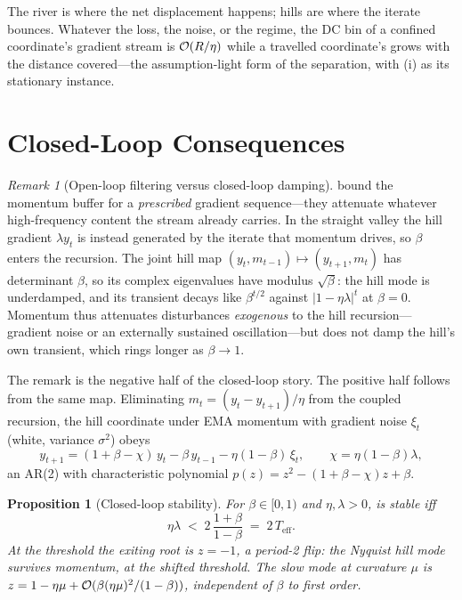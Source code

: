 \documentclass[11pt,a4paper]{article}
\newtheorem{proposition}{Proposition}
\theoremstyle{remark}
\newtheorem{remark}{Remark}
\newcommand{\Teff}{T_{\mathrm{eff}}}
\begin{document}
The river is where the net displacement happens; hills are where the iterate bounces.
Whatever the loss, the noise, or the regime, the DC bin of a confined coordinate's gradient stream is $\mathcal{O}(R/\eta)$ while a travelled coordinate's grows with the distance covered---the assumption-light form of the separation, with (i) as its stationary instance.

\section{Closed-Loop Consequences}
\label{sec:loop}

\begin{remark}[Open-loop filtering versus closed-loop damping]
\label{rem:closedloop}
 bound the momentum buffer for a \emph{prescribed} gradient sequence---they attenuate whatever high-frequency content the stream already carries.
In the straight valley the hill gradient $\lambda y_t$ is instead generated by the iterate that momentum drives, so $\beta$ enters the recursion.
The joint hill map $(y_t,m_{t-1})\mapsto(y_{t+1},m_t)$ has determinant $\beta$, so its complex eigenvalues have modulus $\sqrt\beta$: the hill mode is underdamped, and its transient decays like $\beta^{t/2}$ against $\lvert1-\eta\lambda\rvert^{t}$ at $\beta=0$.
Momentum thus attenuates disturbances \emph{exogenous} to the hill recursion---gradient noise or an externally sustained oscillation---but does not damp the hill's own transient, which rings longer as $\beta\to1$.
\end{remark}

The remark is the negative half of the closed-loop story.
The positive half follows from the same map.
Eliminating $m_t=(y_t-y_{t+1})/\eta$ from the coupled recursion, the hill coordinate under EMA momentum with gradient noise $\xi_t$ (white, variance $\sigma^2$) obeys
\begin{equation}
\label{eq:closedloop}
y_{t+1}=(1+\beta-\chi)\,y_t-\beta\,y_{t-1}-\eta(1-\beta)\,\xi_t,\qquad \chi=\eta(1-\beta)\lambda,
\end{equation}
an AR(2) with characteristic polynomial $p(z)=z^2-(1+\beta-\chi)z+\beta$.

\begin{proposition}[Closed-loop stability]
\label{prop:stability}
For $\beta\in[0,1)$ and $\eta,\lambda>0$,  is stable iff
\[
\eta\lambda\;<\;2\,\frac{1+\beta}{1-\beta}\;=\;2\,\Teff .
\]
At the threshold the exiting root is $z=-1$, a period-2 flip: the Nyquist hill mode survives momentum, at the shifted threshold.
The slow mode at curvature $\mu$ is $z=1-\eta\mu+\mathcal{O}(\beta(\eta\mu)^2/(1-\beta))$, independent of $\beta$ to first order.
\end{proposition}
\end{document}
